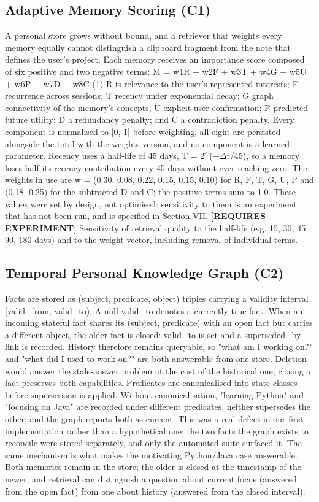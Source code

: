 \documentclass[conference]{IEEEtran}
\begin{document}
\subsection{Adaptive Memory Scoring (C1)}
A personal store grows without bound, and a retriever that weights every memory equally cannot distinguish a clipboard fragment from the note that defines the user's project. Each memory receives an importance score composed of six positive and two negative terms:
M = w1R + w2F + w3T + w4G + w5U + w6P $-$ w7D $-$ w8C        (1)
R is relevance to the user's represented interests; F recurrence across sessions; T recency under exponential decay; G graph connectivity of the memory's concepts; U explicit user confirmation; P predicted future utility; D a redundancy penalty; and C a contradiction penalty. Every component is normalised to [0, 1] before weighting, all eight are persisted alongside the total with the weights version, and no component is a learned parameter. Recency uses a half-life of 45 days, T = 2\textasciicircum{}($-$$\Delta$t/45), so a memory loses half its recency contribution every 45 days without ever reaching zero. The weights in use are w = (0.30, 0.08, 0.22, 0.15, 0.15, 0.10) for R, F, T, G, U, P and (0.18, 0.25) for the subtracted D and C; the positive terms sum to 1.0. These values were set by design, not optimised: sensitivity to them is an experiment that has not been run, and is specified in Section VII.
\textbf{[REQUIRES EXPERIMENT]} Sensitivity of retrieval quality to the half-life (e.g. 15, 30, 45, 90, 180 days) and to the weight vector, including removal of individual terms.
\subsection{Temporal Personal Knowledge Graph (C2)}
Facts are stored as (subject, predicate, object) triples carrying a validity interval [valid\_from, valid\_to). A null valid\_to denotes a currently true fact. When an incoming stateful fact shares its (subject, predicate) with an open fact but carries a different object, the older fact is closed: valid\_to is set and a superseded\_by link is recorded. History therefore remains queryable, so "what am I working on?" and "what did I used to work on?" are both answerable from one store. Deletion would answer the stale-answer problem at the cost of the historical one; closing a fact preserves both capabilities.
Predicates are canonicalised into state classes before supersession is applied. Without canonicalisation, "learning Python" and "focusing on Java" are recorded under different predicates, neither supersedes the other, and the graph reports both as current. This was a real defect in our first implementation rather than a hypothetical one: the two facts the graph exists to reconcile were stored separately, and only the automated suite surfaced it.
The same mechanism is what makes the motivating Python/Java case answerable. Both memories remain in the store; the older is closed at the timestamp of the newer, and retrieval can distinguish a question about current focus (answered from the open fact) from one about history (answered from the closed interval).
\end{document}
